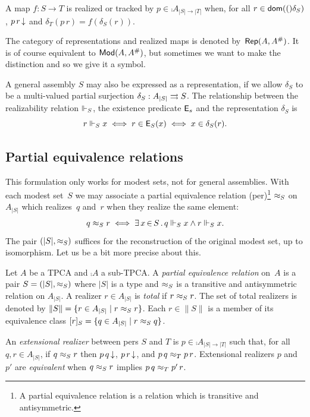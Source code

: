 A map $f : S \to T$ is realized or tracked by $p \in \comp{A}_{|S| \to
  |T|}$ when, for all $r \in \mathsf{dom}(()\delta_S)$, $p\,r\,{\downarrow}$ and
$\delta_T(p\,r) = f(\delta_S(r))$.

The category of representations and realized maps is denoted
by~$\mathsf{Rep}(A,A^{\#})$. It is of course equivalent to $\mathsf{Mod}(A,
  A^{\#})$, but sometimes we want to make the distinction and so we
give it a symbol.

A general assembly $S$ may also be expressed as a representation, if
we allow $\delta_S$ to be a multi-valued partial surjection $\delta_S
: A_{|S|} \rightrightarrows S$. The relationship between the realizability
relation $\Vdash_S$, the existence predicate $\mathsf{E}_s$ and the
representation $\delta_S$ is
%
\begin{equation*}
  r \Vdash_S x \iff
  r \in \mathsf{E}_S(x) \iff
  x \in \delta_S(r).
\end{equation*}


\subsection{Partial equivalence relations}
\label{sec:pers}

This formulation only works for modest sets, not for general
assemblies. With each modest set~$S$ we may associate a partial
equivalence relation (per)\footnote{A partial equivalence relation is
  a relation which is transitive and antisymmetric.} $\approx_S$ on
$A_{|S|}$ which realizes~$q$ and~$r$ when they realize the same
element:
%
\begin{equation*}
  q \approx_S r \iff
  \exists\, x \,{\in}\, S\,.\,q \Vdash_S x \land r \Vdash_S x.
\end{equation*}
%
The pair $(|S|, {\approx_S})$ suffices for the reconstruction of the
original modest set, up to isomorphism. Let us be a bit more precise
about this.

Let $A$ be a TPCA and $\comp{A}$ a sub-TPCA. A \emph{partial
  equivalence relation} on~$A$ is a pair $S = (|S|, {\approx_S})$ where
$|S|$ is a type and $\approx_S$ is a transitive and antisymmetric
relation on $A_{|S|}$. A realizer $r \in A_{|S|}$ is \emph{total} if
$r \approx_S r$. The set of total realizers is denoted by $\|S\| = \{r
  \in A_{|S|} \mid r \approx_S r\}$. Each $r \in \|S\|$ is a member of
its equivalence class $[r]_S = \{q \in A_{|S|} \mid r \approx_S q\}$.

An \emph{extensional realizer} between pers $S$ and $T$ is $p \in
\comp{A}_{|S| \to |T|}$ such that, for all $q, r \in A_{|S|}$, if $q
\approx_S r$ then $p\,q\,{\downarrow}$, $p\,r\,{\downarrow}$, and $p\,q \approx_T
p\,r$. Extensional realizers $p$ and $p'$ are \emph{equivalent} when
$q \approx_S r$ implies $p\,q \approx_T p'\,r$.

